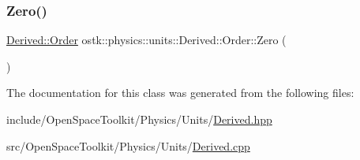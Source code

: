 \mbox{\label{classostk_1_1physics_1_1units_1_1_derived_1_1_order_a3d73f8e4264528130adfe7d596a2ac2b}} 
\subsubsection{\texorpdfstring{Zero()}{Zero()}}
{\footnotesize\ttfamily \hyperlink{classostk_1_1physics_1_1units_1_1_derived_1_1_order}{Derived\+::\+Order} ostk\+::physics\+::units\+::\+Derived\+::\+Order\+::\+Zero (\begin{DoxyParamCaption}{ }\end{DoxyParamCaption})\hspace{0.3cm}{\ttfamily [static]}}



The documentation for this class was generated from the following files\+:\begin{DoxyCompactItemize}
\item 
include/\+Open\+Space\+Toolkit/\+Physics/\+Units/\hyperlink{_derived_8hpp}{Derived.\+hpp}\item 
src/\+Open\+Space\+Toolkit/\+Physics/\+Units/\hyperlink{_derived_8cpp}{Derived.\+cpp}\end{DoxyCompactItemize}
